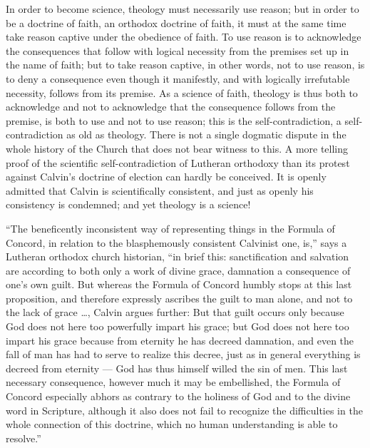 \documentclass[12pt]{book}
\newcommand{\opage}[1]{\marginnote{\footnotesize\textit{[#1]}}}
\begin{document}
In order to become science, theology must necessarily use reason; but in order
to be a doctrine of faith, an orthodox doctrine of faith, it must at the same
time take reason captive under the obedience of faith. To use reason is to
acknowledge the consequences that follow with logical necessity from the
premises set up in the name of faith; but to take reason captive, in other
words, not to use reason, is to deny a consequence even though it manifestly,
and with logically irrefutable necessity, follows from its premise. As a
science of faith,
\opage{246}\setcounter{footnote}{0}%
theology is thus both to acknowledge and not to acknowledge that the
consequence follows from the premise, is both to use and not to use reason;
this is the self-contradiction, a self-contradiction as old as theology.
There is not a single dogmatic dispute in the whole history of the Church that
does not bear witness to this. A more telling proof of the scientific
self-contradiction of Lutheran orthodoxy than its protest against Calvin's
doctrine of election can hardly be conceived. It is openly admitted that
Calvin is scientifically consistent, and just as openly his consistency is
condemned; and yet theology is a science!

``The beneficently inconsistent way of representing things in the Formula of
Concord, in relation to the blasphemously consistent Calvinist one, is,'' says
a Lutheran orthodox church historian, ``in brief this: sanctification and
salvation are according to both only a work of divine grace, damnation a
consequence of one's own guilt. But whereas the Formula of Concord humbly
stops at this last proposition, and therefore expressly ascribes the guilt to
man alone, and not to the lack of grace \ldots{}, Calvin argues further: But
that guilt occurs only because God does not here too powerfully impart his
grace; but God does not here too impart his grace because from eternity he has
decreed damnation, and even the fall of man has had to serve to realize this
decree, just as in general everything is decreed from eternity --- God has
thus himself willed the sin of men. This last necessary consequence, however
much it may be embellished, the Formula of Concord especially abhors as
contrary to the holiness of God and to the divine word in Scripture, although
it also does not fail to recognize the difficulties in the
\opage{247}\setcounter{footnote}{0}%
whole connection of this doctrine, which no human understanding is able to
resolve.''
\end{document}
